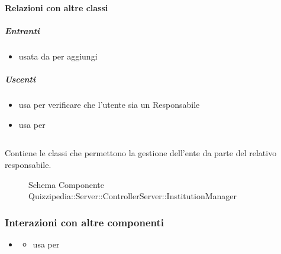 \paragraph{Relazioni con altre classi}
\subparagraph{Entranti}
\begin{itemize}
\item usata da  per aggiungi
\end{itemize}
\subparagraph{Uscenti}
\begin{itemize}
\item usa  per verificare che l'utente sia un Responsabile
\item usa  per 
\end{itemize}
\subsection{}
Contiene le classi che permettono la gestione dell'ente da parte del relativo responsabile.
\begin{figure}[H]
\centering
\noindent{}
\caption[Schema Componente Quizzipedia::Server::ControllerServer::InstitutionManager]{Schema Componente Quizzipedia::Server::ControllerServer::InstitutionManager}
\end{figure}
\subsubsection{Interazioni con altre componenti}
\begin{itemize}
\item {}
\begin{itemize}
\item usa  per 
\end{itemize}
\end{itemize}
